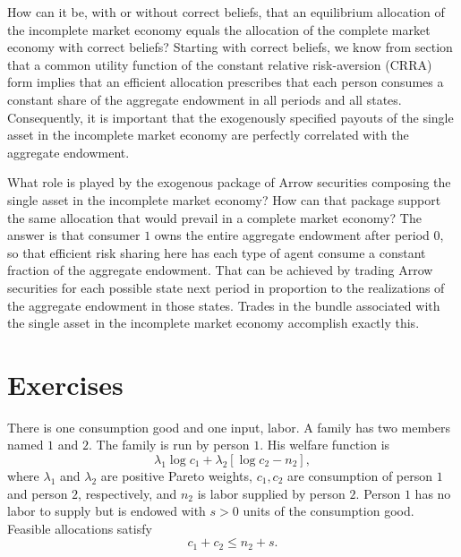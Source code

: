 How can it be, with or without
correct beliefs, that an  equilibrium
allocation of the incomplete market economy equals the allocation  of the complete market economy
with correct beliefs? Starting with  correct beliefs, we
know from section 
that  a common utility
function of the constant relative risk-aversion (CRRA) form
implies that an efficient allocation prescribes that each
 person  consumes a constant share of the aggregate endowment
in all periods and all states. Consequently,  it is  important
that the exogenously specified payouts of the single asset in the
incomplete market economy are perfectly correlated with the
aggregate endowment.

What  role is played by the exogenous package  of
Arrow securities composing  the single asset in the
incomplete market economy?  How can that package 
support the same  allocation that would prevail in  a complete
market economy? The answer is that consumer $1$ owns the entire
aggregate endowment after period $0$, so that efficient
risk sharing  here  has  each type of agent  
consume a constant fraction of the aggregate endowment. That  can be achieved
by trading Arrow securities for each possible
state next period in proportion to the realizations of the
aggregate endowment in those states.  Trades  in
  the  bundle
associated with the single asset in the incomplete market economy accomplish exactly this.



























\showchaptIDfalse \showsectIDfalse
\section{Exercises}
\showchaptIDtrue \showsectIDtrue
\medskip
\medskip

 
\medskip
\noindent There is one consumption good and one input, labor.
 A family has two members named $1$ and $2$.  The family is run by person $1$.  His welfare function
is
$$ \lambda_1 \log c_1 + \lambda_2  [\log c_2 - n_2 ] , $$
where $\lambda_1$ and $\lambda_2$ are positive Pareto weights,  $c_1, c_2$ are  consumption of  person $1$ and person $2$, respectively, and $n_2$ is labor supplied by person $2$. Person $1$ has no  labor to supply  but is endowed
with $s > 0$ units of the consumption good.  Feasible allocations satisfy
$$ c_1 + c_2 \leq n_2 + s .$$

